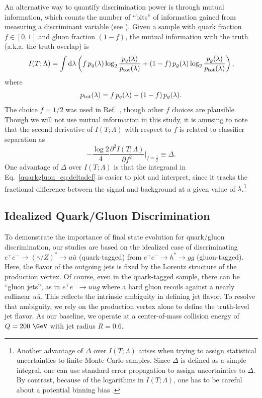 \documentclass[11pt]{cernrep}
\begin{document}
An alternative way to quantify discrimination power is through mutual information, which counts the number of ``bits'' of information gained from measuring a discriminant variable (see \cite{Larkoski:2014pca}).  Given a sample with quark fraction $f \in [0,1]$ and gluon fraction $(1-f)$, the mutual information with the truth (a.k.a. the truth overlap) is
\begin{equation}
I(T; \Lambda) = \int \text{d} \lambda \left(f \, p_q(\lambda) \log_2 \frac{p_q(\lambda)}{p_{\rm tot}(\lambda)} + (1-f) \, p_g(\lambda) \log_2 \frac{p_g(\lambda)}{p_{\rm tot}(\lambda)}   \right),
\end{equation}
where
\begin{equation}
p_{\rm tot}(\lambda) = f \, p_q(\lambda) + (1-f) \, p_g(\lambda).
\end{equation}
The choice $f = 1/2$ was used in Ref.~\cite{Larkoski:2014pca}, though other $f$ choices are plausible.  Though we will not use mutual information in this study, it is amusing to note that the second derivative of $I(T;\Lambda)$ with respect to $f$ is related to classifier separation as
\begin{equation}
\label{quarkgluon_eq:altdeltadef}
- \frac{\log 2}{4} \frac{\partial^2 I(T;\Lambda)}{\partial f^2} \Big|_{f = \frac{1}{2}} \equiv \Delta.
\end{equation}
One advantage of $\Delta$ over $I(T;\Lambda)$ is that the integrand in Eq.~\eqref{quarkgluon_eq:deltadef} is easier to plot and interpret, since it tracks the fractional difference between the signal and background at a given value of $\lambda$.\footnote{Another advantage of $\Delta$ over $I(T; \Lambda)$ arises when trying to assign statistical uncertainties to finite Monte Carlo samples.  Since $\Delta$ is defined as a simple integral, one can use standard error propagation to assign uncertainties to $\Delta$.  By contrast, because of the logarithms in $I(T; \Lambda)$, one has to be careful about a potential binning bias \cite{Larkoski:2014pca}.}

\subsection{Idealized Quark/Gluon Discrimination}
\label{quarkgluon_sec:ee}

To demonstrate the importance of final state evolution for quark/gluon discrimination, our studies are based on the idealized case of discriminating $e^+ e^- \to (\gamma/Z)^* \to u \bar{u}$ (quark-tagged) from $e^+ e^- \to h^* \to gg$ (gluon-tagged).  Here, the flavor of the outgoing jets is fixed by the Lorentz structure of the production vertex.  Of course, even in the quark-tagged sample, there can be ``gluon jets'', as in $e^+ e^- \to u \bar{u} g$ where a hard gluon recoils against a nearly collinear $u \bar{u}$.  This reflects the intrinsic ambiguity in defining jet flavor.   To resolve that ambiguity, we rely on the production vertex alone to define the truth-level jet flavor.  As our baseline, we operate at a center-of-mass collision energy of $Q = 200~\GeV$ with jet radius $R = 0.6$.  
\end{document}
